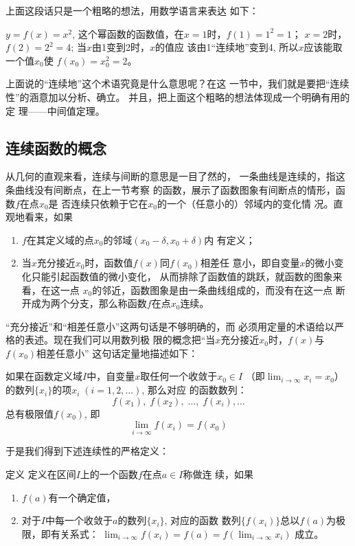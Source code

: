 上面这段话只是一个粗略的想法，用数学语言来表达
如下：

$y=f(x)=x^2$, 这个幂函数的函数值，在$x=1$时，$f(1)=1^2=1$；
$x=2$时，$f(2)=2^2=4$; 当$x$由1变到2时，$x$的值应
该由1“连续地”变到4, 所以$x$应该能取一个值$x_0$使
$f(x_0)=x^2_0=2$。

上面说的“连续地”这个术语究竟是什么意思呢？在这
一节中，我们就是要把“连续性”的涵意加以分析、确立。
并且，把上面这个粗略的想法体现成一个明确有用的定
理——中间值定理。

\subsection{连续函数的概念}
从几何的直观来看，连续与间断的意思是一目了然的，
一条曲线是连续的，指这条曲线没有间断点，在上一节考察
的函数，展示了函数图象有间断点的情形，函数$f$在点$x_0$是
否连续只依赖于它在$x_0$的一个（任意小的）邻域内的变化情
况。直观地看来，如果
\begin{enumerate}
\item $f$在其定义域的点$x_0$的邻域$(x_0-\delta,x_0+\delta)$内
有定义；
\item 当$x$充分接近$x_0$时，函数值$f(x)$同$f(x_0)$相差任
意小，即自变量$x$的微小变化只能引起函数值的微小变化，
从而排除了函数值的跳跃，就函数的图象来看，在这一点
$x_0$的邻近，函数图象是由一条曲线组成的，而没有在这一点
断开成为两个分支，那么称函数$f$在点$x_0$连续。
\end{enumerate}


“充分接近”和“相差任意小”这两句话是不够明确的，而
必须用定量的术语给以严格的表述。现在我们可以用数列极
限的概念把“当$x$充分接近$x_0$时，$f(x)$与$f(x_0)$相差任意小”
这句话定量地描述如下：

如果在函数定义域$I$中，自变量$x$取任何一个收敛于$x_0\in I$
（即$\displaystyle\lim_{i\to\infty}x_i=x_0$）的数列$\{x_i\}$的项$x_i\; (i=1,2,\ldots)$, 那么对应
的函数数列：
\[f(x_1),\; f(x_2),\; \ldots,\;  f(x_i),\ldots\]
总有极限值$f(x_0)$, 即
\[\lim_{i\to\infty} f(x_i)=f(x_0)\]

于是我们得到下述连续性的严格定义：

\begin{blk}{定义}
     定义在区间$I$上的一个函数$f$在点$a\in I$称做连
续，如果
\begin{enumerate}
\item $f(a)$有一个确定值，
\item 对于$I$中每一个收敛于$a$的数列$\{x_i\}$, 对应的函数
数列$\{f(x_i)\}$总以$f(a)$为极限，即有关系式：
$\displaystyle\lim_{i\to \infty}f(x_i)=f(a)=f\left(\displaystyle\lim_{i\to \infty}x_i\right)$
成立。
\end{enumerate}
\end{blk}


